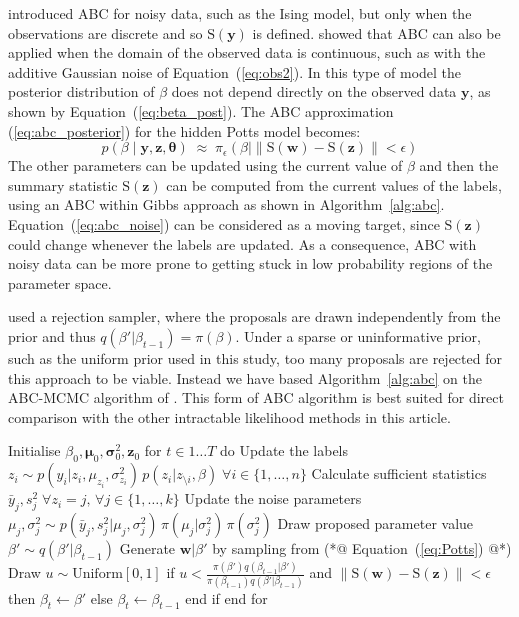 \documentclass[nojss,shortnames]{jss}\usepackage[]{graphicx}\usepackage[]{color}
\begin{document}
\citet{Everitt2012} introduced ABC for noisy data, such as the Ising model, but only when the observations are discrete and so $\mathrm{S}(\mathbf{y})$ is defined. \citet{Moores2014} showed that ABC can also be applied when the domain of the observed data is continuous, such as with the additive Gaussian noise of Equation~(\ref{eq:obs2}). In this type of model the posterior distribution of $\beta$ does not depend directly on the observed data $\mathbf{y}$, as shown by Equation~(\ref{eq:beta_post}). The ABC approximation (\ref{eq:abc_posterior}) for the hidden Potts model becomes:
\begin{equation}
\label{eq:abc_noise}
p\left(\beta \mid \mathbf{y}, \mathbf{z}, \boldsymbol\theta \right) \;\approx\; \pi_\epsilon\left(\beta \mid \| \mathrm{S}(\mathbf{w}) - \mathrm{S}(\mathbf{z}) \| < \epsilon\right)
\end{equation}
The other parameters can be updated using the current value of $\beta$ and then the summary statistic $\mathrm{S}(\mathbf{z})$ can be computed from the current values of the labels, using an ABC within Gibbs approach as shown in Algorithm~\ref{alg:abc}. Equation~(\ref{eq:abc_noise}) can be considered as a moving target, since $\mathrm{S}(\mathbf{z})$ could change whenever the labels are updated. As a consequence, ABC with noisy data can be more prone to getting stuck in low probability regions of the parameter space.

\citet{Grelaud2009} used a rejection sampler, where the proposals are drawn independently from the prior and thus $q(\beta'|\beta_{t-1}) = \pi(\beta)$. Under a sparse or uninformative prior, such as the uniform prior used in this study, too many proposals are rejected for this approach to be viable. Instead we have based  Algorithm~\ref{alg:abc} on the ABC-MCMC algorithm of \citet{Marjoram2003}. This form of ABC algorithm is best suited for direct comparison with the other intractable likelihood methods in this article.

\begin{algorithm}[float,caption={ABC-MCMC with noisy data}, label={alg:abc}]
Initialise $\beta_0, \boldsymbol\mu_0, \boldsymbol\sigma^2_0, \mathbf{z}_0$
for $t \in 1\dots T$ do
  Update the labels $z_i \sim p(y_i | z_i, \mu_{z_i}, \sigma^2_{z_i}) \,p(z_i | z_{\setminus i}, \beta) \; \forall i \in \{ 1, \dots, n\}$
  Calculate sufficient statistics $\bar{y}_j, s^2_j \; \forall z_i = j, \, \forall j \in \{ 1, \dots, k\}$
  Update the noise parameters $\mu_j, \sigma^2_j \sim p(\bar{y}_j, s^2_j | \mu_j, \sigma_j^2) \,\pi(\mu_j | \sigma^2_j) \, \pi(\sigma^2_j)$
  Draw proposed parameter value $\beta' \sim q(\beta' | \beta_{t-1})$
  Generate $\mathbf{w}|\beta'$ by sampling from (*@ Equation~(\ref{eq:Potts}) @*)
  Draw $u \sim \mathrm{Uniform}[0,1]$
  if $u < \frac{\pi(\beta') q(\beta_{t-1} | \beta')}{\pi(\beta_{t-1}) q(\beta' | \beta_{t-1})}$ and $\| \mathrm{S}(\mathbf{w}) - \mathrm{S}(\mathbf{z}) \| < \epsilon$ then
    $\beta_t \gets \beta'$ 
  else
    $\beta_t \gets \beta_{t-1}$ 
  end if
end for
\end{algorithm}
\end{document}
